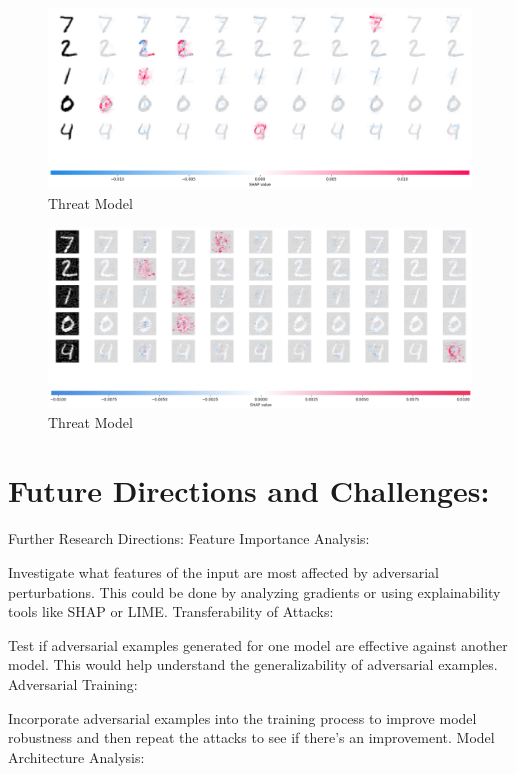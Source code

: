 \documentclass[10pt, conference, a4paper, final]{IEEEtran}
\begin{document}
        \begin{figure}[!ht]
            \centering
            \includegraphics[width=1\textwidth]{paper_images/correctshap.png}
            \caption{Threat Model}
            \label{threat model}
            \end{figure}
            \begin{figure}[!ht]
                \centering
                \includegraphics[width=1\textwidth]{paper_images/adversarial.png}
                \caption{Threat Model}
                \label{threat model}
                \end{figure}
\section{Future Directions and Challenges:}

Further Research Directions:
Feature Importance Analysis:

Investigate what features of the input are most affected by adversarial perturbations. This could be done by analyzing gradients or using explainability tools like SHAP or LIME.
Transferability of Attacks:

Test if adversarial examples generated for one model are effective against another model. This would help understand the generalizability of adversarial examples.
Adversarial Training:

Incorporate adversarial examples into the training process to improve model robustness and then repeat the attacks to see if there’s an improvement.
Model Architecture Analysis:
\end{document}
